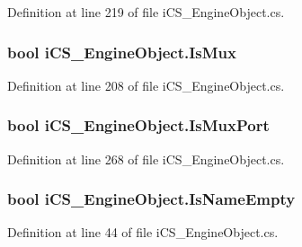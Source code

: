 Definition at line 219 of file i\+C\+S\+\_\+\+Engine\+Object.\+cs.

\hypertarget{classi_c_s___engine_object_a4d7ed6448c3f38dd64d617691d29ee0e}{
\subsubsection[{Is\+Mux}]{\setlength{\rightskip}{0pt plus 5cm}bool i\+C\+S\+\_\+\+Engine\+Object.\+Is\+Mux\hspace{0.3cm}{\ttfamily [get]}}}\label{classi_c_s___engine_object_a4d7ed6448c3f38dd64d617691d29ee0e}


Definition at line 208 of file i\+C\+S\+\_\+\+Engine\+Object.\+cs.

\hypertarget{classi_c_s___engine_object_a52156fbdc03b88200a914c48614756a7}{
\subsubsection[{Is\+Mux\+Port}]{\setlength{\rightskip}{0pt plus 5cm}bool i\+C\+S\+\_\+\+Engine\+Object.\+Is\+Mux\+Port\hspace{0.3cm}{\ttfamily [get]}}}\label{classi_c_s___engine_object_a52156fbdc03b88200a914c48614756a7}


Definition at line 268 of file i\+C\+S\+\_\+\+Engine\+Object.\+cs.

\hypertarget{classi_c_s___engine_object_a2ceb75035f670ac581cdf1125e0280c8}{
\subsubsection[{Is\+Name\+Empty}]{\setlength{\rightskip}{0pt plus 5cm}bool i\+C\+S\+\_\+\+Engine\+Object.\+Is\+Name\+Empty\hspace{0.3cm}{\ttfamily [get]}}}\label{classi_c_s___engine_object_a2ceb75035f670ac581cdf1125e0280c8}


Definition at line 44 of file i\+C\+S\+\_\+\+Engine\+Object.\+cs.

